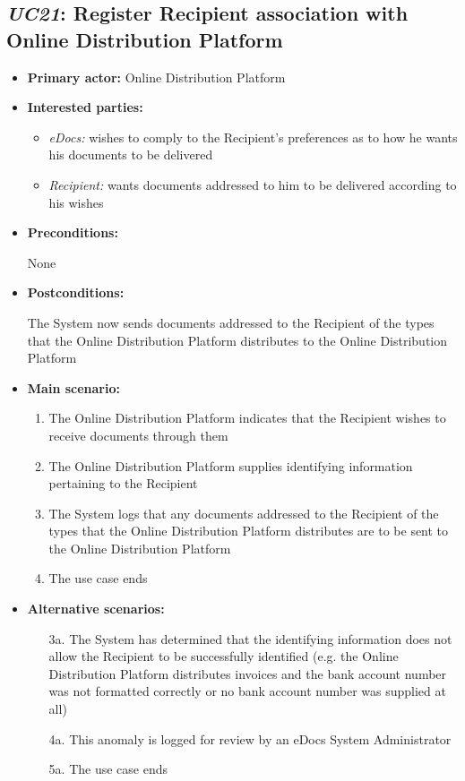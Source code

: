\documentclass[a4paper,10pt]{article}
\begin{document}
\subsection{\emph{UC21}: Register Recipient association with Online Distribution Platform}
\begin{itemize}
	\item \textbf{Primary actor:} Online Distribution Platform
	\item \textbf{Interested parties:} 
	\begin{itemize}
		\item \textit{eDocs:} wishes to comply to the Recipient's preferences as to how he wants his documents to be delivered
		\item \textit{Recipient:} wants documents addressed to him to be delivered according to his wishes
	\end{itemize}
	
	\item \textbf{Preconditions:}
	\begin{itemize}
		None
	\end{itemize}
	
	\item \textbf{Postconditions:}
	\begin{itemize}
		The System now sends documents addressed to the Recipient of the types that the Online Distribution Platform distributes to the Online Distribution Platform
	\end{itemize}
	
	\item \textbf{Main scenario:} 
	\begin{enumerate}
		\item The Online Distribution Platform indicates that the Recipient wishes to receive documents through them
		\item The Online Distribution Platform supplies identifying information pertaining to the Recipient
		\item The System logs that any documents addressed to the Recipient of the types that the Online Distribution Platform distributes are to be sent to the Online Distribution Platform
		\item The use case ends
	\end{enumerate}
	
	\item \textbf{Alternative scenarios:} 
	\begin{enumerate}
		\item [3a.] The System has determined that the identifying information does not allow the Recipient to be successfully identified (e.g. the Online Distribution Platform distributes invoices and the bank account number was not formatted correctly or no bank account number was supplied at all)
		\item [4a.] This anomaly is logged for review by an eDocs System Administrator
		\item [5a.] The use case ends
	\end{enumerate}
	

\end{itemize}
\end{document}
